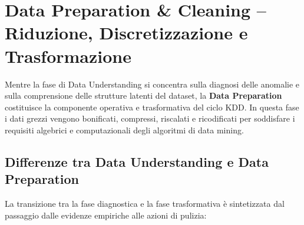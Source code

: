 \chapter{Data Preparation \& Cleaning -- Riduzione, Discretizzazione e Trasformazione}
\label{chap:dm-data-preparation-cleaning}

Mentre la fase di Data Understanding si concentra sulla diagnosi delle anomalie e sulla comprensione delle strutture latenti del dataset, la \textbf{Data Preparation} costituisce la componente operativa e trasformativa del ciclo KDD. In questa fase i dati grezzi vengono bonificati, compressi, riscalati e ricodificati per soddisfare i requisiti algebrici e computazionali degli algoritmi di data mining.

\section{Differenze tra Data Understanding e Data Preparation}
\label{sec:dm-du-vs-dp}

La transizione tra la fase diagnostica e la fase trasformativa è sintetizzata dal passaggio dalle evidenze empiriche alle azioni di pulizia:

